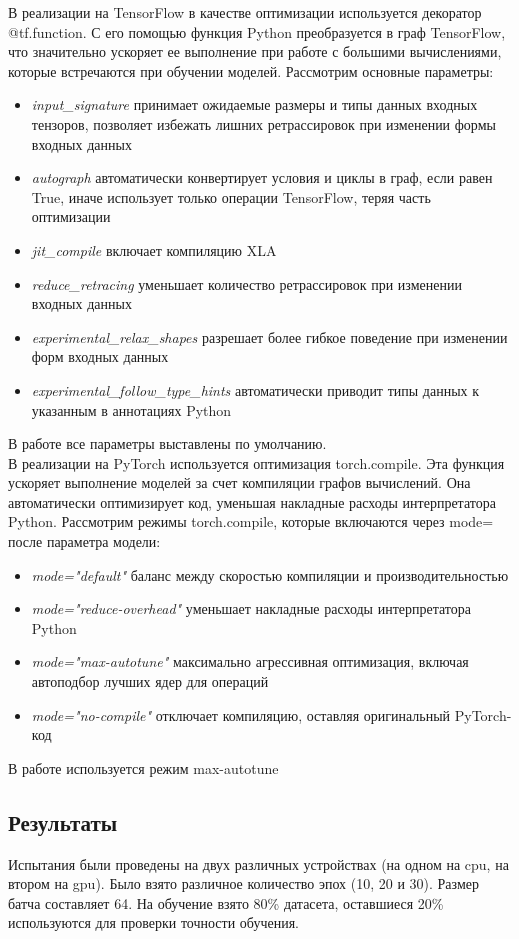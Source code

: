 \documentclass[a4paper,12pt,titlepage,final]{article}
\begin{document}
В реализации на TensorFlow в качестве оптимизации используется декоратор @tf.function. С его помощью функция Python преобразуется в граф TensorFlow, что значительно ускоряет ее выполнение при работе с большими вычислениями, которые встречаются при обучении моделей. Рассмотрим основные параметры:
\begin{itemize}
    \item \textit{input\_signature} принимает ожидаемые размеры и типы данных входных тензоров, позволяет избежать лишних ретрассировок при изменении формы входных данных
    \item \textit{autograph} автоматически конвертирует условия и циклы в граф, если равен True, иначе использует только операции TensorFlow, теряя часть оптимизации
    \item \textit{jit\_compile} включает компиляцию XLA
    \item \textit{reduce\_retracing} уменьшает количество ретрассировок при изменении входных данных
    \item \textit{experimental\_relax\_shapes} разрешает более гибкое поведение при изменении форм входных данных
    \item \textit{experimental\_follow\_type\_hints} автоматически приводит типы данных к указанным в аннотациях Python
\end{itemize}

В работе все параметры выставлены по умолчанию.\\

В реализации на PyTorch используется оптимизация torch.compile. Эта функция ускоряет выполнение моделей за счет компиляции графов вычислений. Она автоматически оптимизирует код, уменьшая накладные расходы интерпретатора Python. Рассмотрим режимы torch.compile, которые включаются через mode= после параметра модели:
\begin{itemize}
    \item \textit{mode="default"} баланс между скоростью компиляции и производительностью
    \item \textit{mode="reduce-overhead"} уменьшает накладные расходы интерпретатора Python
    \item \textit{mode="max-autotune"} максимально агрессивная оптимизация, включая автоподбор лучших ядер для операций
    \item \textit{mode="no-compile"} отключает компиляцию, оставляя оригинальный PyTorch-код
\end{itemize}

В работе используется режим max-autotune
\newpage
\begin{center}
    \item \section{Результаты}
\end{center}
Испытания были проведены на двух различных устройствах (на одном на cpu, на втором на gpu). Было взято различное количество эпох (10, 20 и 30). Размер батча составляет 64. На обучение взято 80\% датасета, оставшиеся 20\% используются для проверки точности обучения.
\end{document}
